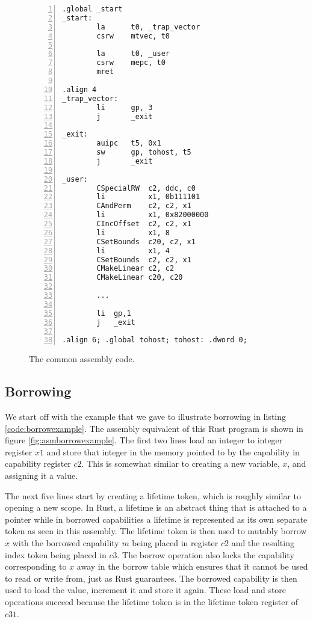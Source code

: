 \begin{figure}[h]
\begin{lstlisting}[style=custASM, numbers = left ,xleftmargin=1.5em]
        .global _start
_start:
        la      t0, _trap_vector
        csrw	mtvec, t0

        la      t0, _user
        csrw    mepc, t0
        mret

.align 4
_trap_vector:
        li      gp, 3
        j       _exit

_exit:
        auipc   t5, 0x1
        sw      gp, tohost, t5
        j       _exit

_user:
        CSpecialRW  c2, ddc, c0
        li          x1, 0b111101
        CAndPerm    c2, c2, x1
        li          x1, 0x82000000
        CIncOffset  c2, c2, x1
        li          x1, 8
        CSetBounds  c20, c2, x1
        li          x1, 4
        CSetBounds  c2, c2, x1
        CMakeLinear c2, c2
        CMakeLinear c20, c20
        
        ...
        
        li  gp,1
        j   _exit

.align 6; .global tohost; tohost: .dword 0;
\end{lstlisting}
\caption{The common assembly code.}
\label{fig:commonasm}
\end{figure}

\subsection{Borrowing}
We start off with the example that we gave to illustrate borrowing in listing \ref{code:borrowexample}.
The assembly equivalent of this Rust program is shown in figure \ref{fig:asmborrowexample}.
The first two lines load an integer to integer register $x1$ and store that integer in the memory pointed to by the capability in capability register $c2$.
This is somewhat similar to creating a new variable, $x$, and assigning it a value.

The next five lines start by creating a lifetime token, which is roughly similar to opening a new scope.
In Rust, a lifetime is an abstract thing that is attached to a pointer while in borrowed capabilities a lifetime is represented as its own separate token as seen in this assembly.
The lifetime token is then used to mutably borrow $x$ with the borrowed capability $m$ being placed in register $c2$ and the resulting index token being placed in $c3$.
The borrow operation also locks the capability corresponding to $x$ away in the borrow table which ensures that it cannot be used to read or write from, just as Rust guarantees.
The borrowed capability is then used to load the value, increment it and store it again.
These load and store operations succeed because the lifetime token is in the lifetime token register of $c31$.

